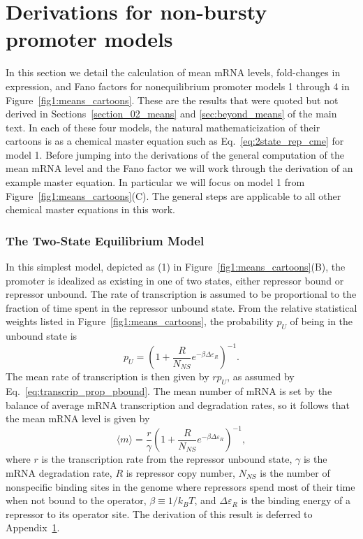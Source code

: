 \section{Derivations for non-bursty promoter models}
\label{sec:non_bursty}

In this section we detail the calculation of mean mRNA levels, fold-changes in
expression, and Fano factors for nonequilibrium promoter models 1 through 4
in Figure~\ref{fig1:means_cartoons}. These are the results that were quoted but
not derived in Sections~\ref{section_02_means} and \ref{sec:beyond_means} of the
main text. In each of these four models, the natural mathematicization of their
cartoons is as a chemical master equation such as Eq.~\ref{eq:2state_rep_cme}
for model 1. Before jumping into the derivations of the general computation of
the mean mRNA level and the Fano factor we will work through the derivation of
an example master equation. In particular we will focus on model 1 from
Figure~\ref{fig1:means_cartoons}(C). The general steps are applicable to all
other chemical master equations in this work.

\subsubsection{The Two-State Equilibrium Model}
In this simplest model, depicted as (1) in Figure~\ref{fig1:means_cartoons}(B),
the promoter is idealized as existing in one of two states, either repressor
bound or repressor unbound. The rate of transcription
is assumed to be proportional to the fraction of time spent
in the repressor unbound state.
From the relative statistical weights listed in
Figure~\ref{fig1:means_cartoons}, the probability $p_U$ of being in the
unbound state is
\begin{equation}
p_U = \left(1 + \frac{R}{N_{NS}} e^{-\beta\Delta\varepsilon_R}\right)^{-1}.
\end{equation}
The mean rate of transcription is then given by $r p_U$, as assumed by
Eq.~\ref{eq:transcrip_prop_pbound}. The mean number of mRNA is
set by the balance of average mRNA transcription and degradation rates,
so it follows that the mean mRNA level is given by
\begin{equation}
\langle m \rangle = \frac{r}{\gamma}
        \left(1 + \frac{R}{N_{NS}} e^{-\beta\Delta\varepsilon_R}\right)^{-1},
\end{equation}
where $r$ is the transcription rate from the repressor unbound state, $\gamma$
is the mRNA degradation rate, $R$ is repressor copy number, $N_{NS}$ is the
number of nonspecific binding sites in the genome where repressors spend most
of their time when not bound to the operator, $\beta \equiv 1/k_BT$, and
$\Delta\varepsilon_R$ is the binding energy of a repressor to its operator site.
The derivation of this result is deferred to Appendix~\ref{sec:non_bursty}.

